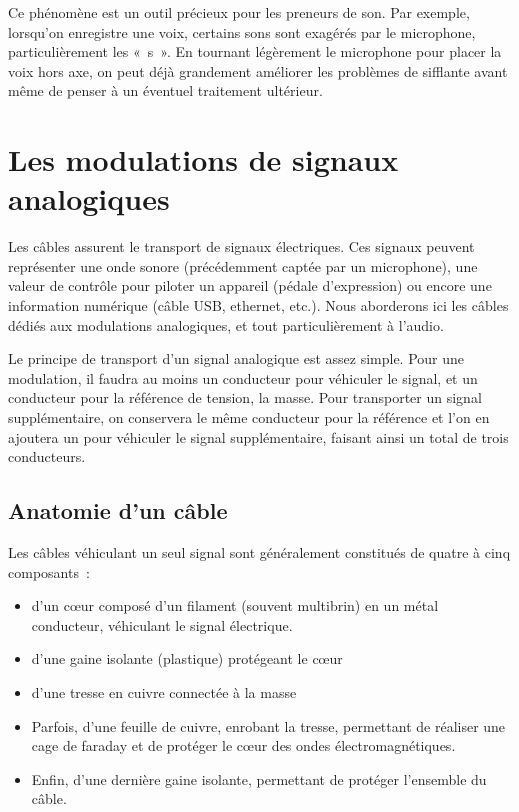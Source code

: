 \documentclass[
]{book}
\providecommand{\tightlist}{%
  \setlength{\itemsep}{0pt}\setlength{\parskip}{0pt}}
\begin{document}
Ce phénomène est un outil précieux pour les preneurs de son. Par exemple, lorsqu'on enregistre une voix, certains sons sont exagérés par le microphone, particulièrement les «~s~». En tournant légèrement le microphone pour placer la voix hors axe, on peut déjà grandement améliorer les problèmes de sifflante avant même de penser à un éventuel traitement ultérieur.

\hypertarget{les-modulations-de-signaux-analogiques}{%
\chapter{Les modulations de signaux analogiques}\label{les-modulations-de-signaux-analogiques}}

Les câbles assurent le transport de signaux électriques. Ces signaux peuvent représenter une onde sonore (précédemment captée par un microphone), une valeur de contrôle pour piloter un appareil (pédale d'expression) ou encore une information numérique (câble USB, ethernet, etc.). Nous aborderons ici les câbles dédiés aux modulations analogiques, et tout particulièrement à l'audio.

Le principe de transport d'un signal analogique est assez simple. Pour une modulation, il faudra au moins un conducteur pour véhiculer le signal, et un conducteur pour la référence de tension, la masse. Pour transporter un signal supplémentaire, on conservera le même conducteur pour la référence et l'on en ajoutera un pour véhiculer le signal supplémentaire, faisant ainsi un total de trois conducteurs.

\hypertarget{anatomie-dun-cuxe2ble}{%
\section{Anatomie d'un câble}\label{anatomie-dun-cuxe2ble}}

Les câbles véhiculant un seul signal sont généralement constitués de quatre à cinq composants~:

\begin{itemize}
\tightlist
\item
  d'un cœur composé d'un filament (souvent multibrin) en un métal conducteur, véhiculant le signal électrique.
\item
  d'une gaine isolante (plastique) protégeant le cœur
\item
  d'une tresse en cuivre connectée à la masse
\item
  Parfois, d'une feuille de cuivre, enrobant la tresse, permettant de réaliser une cage de faraday et de protéger le cœur des ondes électromagnétiques.
\item
  Enfin, d'une dernière gaine isolante, permettant de protéger l'ensemble du câble.
\end{itemize}
\end{document}
